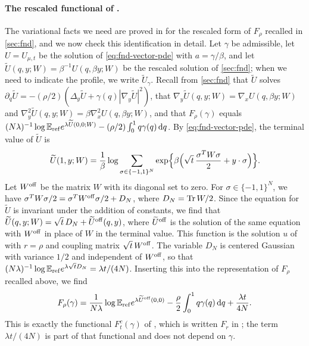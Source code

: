 \paragraph{The rescaled functional of \cite{AL}.}
The variational facts we need are proved in
\cite[Sections~7.1 and~7.4 and Appendix~A]{AL} for the rescaled form of
$F_\rho$ recalled in \cref{sec:fnd}, and we now check this identification in
detail. Let $\gamma$ be admissible, let $U=U_{\mu,t}$ be the solution of
\eqref{eq:fnd-vector-pde} with $a=\gamma/\beta$, and let
$\widetilde U(q,y;W)=\beta^{-1}U(q,\beta y;W)$ be the rescaled solution of
\cref{sec:fnd}; when we need to indicate the profile, we write
$\widetilde U_\gamma$. Recall from \cref{sec:fnd} that $\widetilde U$ solves
$\partial_q\widetilde U=-(\rho/2)(\Delta_y\widetilde U
+\gamma(q)|\nabla_y\widetilde U|^2)$, that
$\nabla_y\widetilde U(q,y;W)=\nabla_xU(q,\beta y;W)$ and
$\nabla_y^2\widetilde U(q,y;W)=\beta\nabla_x^2U(q,\beta y;W)$, and that
$F_\rho(\gamma)$ equals
$(N\lambda)^{-1}\log\mathbb E_{\rm ref}e^{\lambda\widetilde U(0,0;W)}
-(\rho/2)\int_0^1q\gamma(q)\,\mathrm d q$. By \eqref{eq:fnd-vector-pde}, the terminal
value of $\widetilde U$ is
\[
 \widetilde U(1,y;W)=\frac1\beta\log\sum_{\sigma\in\{-1,1\}^N}
 \exp\Bigl\{\beta\Bigl(\sqrt t\,\frac{\sigma^TW\sigma}2+y\cdot\sigma\Bigr)\Bigr\}.
\]
Let $W^{\rm off}$ be the matrix $W$ with its diagonal set to zero. For
$\sigma\in\{-1,1\}^N$, we have $\sigma^TW\sigma/2=\sigma^TW^{\rm off}\sigma/2+D_N$,
where $D_N=\operatorname{Tr} W/2$. Since the equation for $\widetilde U$ is invariant under the addition of
constants, we find that
$\widetilde U(q,y;W)=\sqrt t\,D_N+\widetilde U^{\rm off}(q,y)$, where
$\widetilde U^{\rm off}$ is the solution of the same equation with $W^{\rm
off}$ in place of $W$ in the terminal value. This function is the solution $u$
of \cite[(7.2)]{AL} with $r=\rho$ and coupling matrix $\sqrt t\,W^{\rm off}$.
The variable $D_N$ is centered Gaussian with variance $1/2$ and independent of
$W^{\rm off}$, so that
$(N\lambda)^{-1}\log\mathbb E_{\rm ref}e^{\lambda\sqrt t D_N}=\lambda t/(4N)$.
Inserting this into the representation of $F_\rho$ recalled above, we find
\[
 F_\rho(\gamma)=\frac1{N\lambda}\log\mathbb E_{\rm ref}e^{\lambda\widetilde U^{\rm off}(0,0)}
 -\frac\rho2\int_0^1q\gamma(q)\,\mathrm d q+\frac{\lambda t}{4N}.
\]
This is exactly the functional $F^c_t(\gamma)$ of \cite[(7.2)]{AL}, which is
written $F_r$ in \cite[Section~7.4]{AL}; the term $\lambda t/(4N)$ is part of
that functional and does not depend on $\gamma$.

